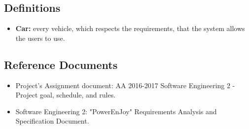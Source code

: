 \subsection{Definitions}
\begin{itemize}
    \item \textbf{Car:} every vehicle, which respects the requirements, that the system allows the users to use.
\end{itemize}

\subsection{Reference Documents}
\begin{itemize}
    \item Project’s Assignment document: AA 2016-2017 Software Engineering 2 - Project goal, schedule, and rules.
    \item Software Engineering 2: "PowerEnJoy" Requirements Analysis and Specification Document.
\end{itemize}